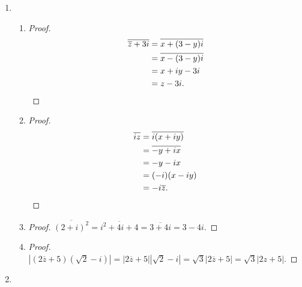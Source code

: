 % 
\begin{enumerate}
\item %
    \begin{enumerate}
        \item %
            \begin{proof}
                \begin{align*}
                    \overline{\overline{z}+3i} &= \overline{x+(3-y)i} \\
                    &= \overline{x-(3-y)i} \\
                    &= x+iy - 3i \\
                    &= z - 3i. \qedhere
                \end{align*}
            \end{proof}
        \item %
            \begin{proof}
                \begin{align*}
                    \overline{iz} &= \overline{i(x+iy)} \\
                    &= \overline{-y+ix} \\
                    &= -y-ix \\
                    &=(-i)(x-iy) \\
                    &=-i\overline{z}. \qedhere
                \end{align*}
            \end{proof}
        \item %
            \begin{proof}
                $\overline{(2+i)^2} = \overline{i^2+4i+4} = \overline{3+4i} = 3-4i$.
            \end{proof}
        \item %
            \begin{proof}
                $|(2\overline{z} + 5)(\sqrt{2} - i)| = |2\overline{z} + 5||\sqrt{2} - i| = \sqrt{3}|2\overline{z} + 5| = \sqrt{3}|2z + 5|$.
            \end{proof}
    \end{enumerate}
\item %
    \begin{enumerate}

\end{enumerate}
\end{enumerate}
